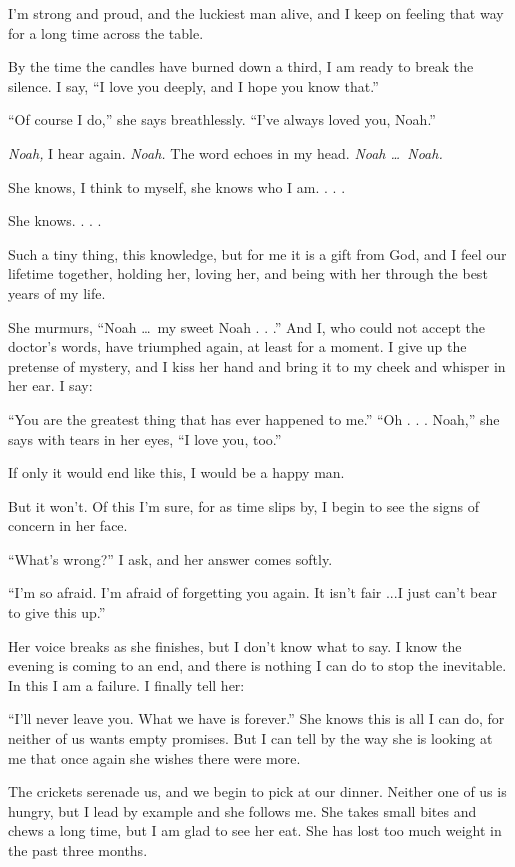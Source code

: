 \documentclass[10pt, twoside, openright]{book}
\begin{document}
I'm strong and proud, and the luckiest man alive, and I keep on feeling
that way for a long time across the table.

By the time the candles have burned down a third, I am ready to break
the silence. I say, ``I love you deeply, and I hope you know that.''


``Of course I do,'' she says breathlessly. ``I've always loved you,
Noah.''


\emph{Noah,} I hear again. \emph{Noah.} The word echoes in my head.
\emph{Noah   \dots\ Noah.}

She knows, I think to myself, she knows who I am. . . .


She knows. . . .


Such a tiny thing, this knowledge, but for me it is a gift from God, and
I feel our lifetime together, holding her, loving her, and being with
her through the best years of my life.

She murmurs, ``Noah   \dots\ my sweet Noah . . .'' And I, who could not
accept the doctor's words, have triumphed again, at least for a moment.
I give up the pretense of mystery, and I kiss her hand and bring it to
my cheek and whisper in her ear. I say:


``You are the greatest thing that has ever happened to me.'' ``Oh . . .
Noah,'' she says with tears in her eyes, ``I love you, too.''

If only it would end like this, I would be a happy man.


But it won't. Of this I'm sure, for as time slips by, I begin to see the
signs of concern in her face.


``What's wrong?'' I ask, and her answer comes softly.


``I'm so afraid. I'm afraid of forgetting you again. It isn't fair ...I
just can't bear to give this up.''

Her voice breaks as she finishes, but I don't know what to say. I know
the evening is coming to an end, and there is nothing I can do to stop
the inevitable. In this I am a failure. I finally tell her:

``I'll never leave you. What we have is forever.'' She knows this is all
I can do, for neither of us wants empty promises. But I can tell by the
way she is looking at me that once again she wishes there were more.

The crickets serenade us, and we begin to pick at our dinner. Neither
one of us is hungry, but I lead by example and she follows me. She takes
small bites and chews a long time, but I am glad to see her eat. She has
lost too much weight in the past three months.
\end{document}
